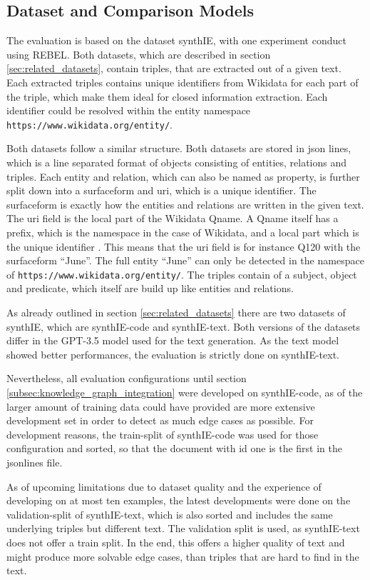 \documentclass[a4paper,oneside,bibliography=totoc]{scrbook}
\begin{document}
\subsection{Dataset and Comparison Models}
\label{sec:dataset}

The evaluation is based on the dataset synthIE, with one experiment conduct using REBEL. Both datasets, which are described in section \ref{sec:related_datasets}, contain triples, that are extracted out of a given text. Each extracted triples contains unique identifiers from Wikidata for each part of the triple, which make them ideal for closed information extraction. Each identifier could be resolved within the entity namespace \texttt{https://www.wikidata.org/entity/}.

Both datasets follow a similar structure. Both datasets are stored in json lines, which is a line separated format of objects consisting of entities, relations and triples. Each entity and relation, which can also be named as property, is further split down into a surfaceform and uri, which is a unique identifier. The surfaceform is exactly how the entities and relations are written in the given text. The uri field is the local part of the Wikidata Qname. A Qname itself has a prefix, which is the namespace in the case of Wikidata, and a local part which is the unique identifier \cite{ASF2010}. This means that the uri field is for instance Q120 with the surfaceform \enquote{June}. The full entity \enquote{June} can only be detected in the namespace of \texttt{https://www.wikidata.org/entity/}. The triples contain of a subject, object and predicate, which itself are build up like entities and relations.

As already outlined in section \ref{sec:related_datasets} there are two datasets of synthIE, which are synthIE-code and synthIE-text. Both versions of the datasets differ in the GPT-3.5 model used for the text generation. As the text model showed better performances, the evaluation is strictly done on synthIE-text.

Nevertheless, all evaluation configurations until section \ref{subsec:knowledge_graph_integration} were developed on synthIE-code, as of the larger amount of training data could have provided are more extensive development set in order to detect as much edge cases as possible. For development reasons, the train-split of synthIE-code was used for those configuration and sorted, so that the document with id one is the first in the jsonlines file.

As of upcoming limitations due to dataset quality and the experience of developing on at most ten examples, the latest developments were done on the validation-split of synthIE-text, which is also sorted and includes the same underlying triples but different text. The validation split is used, as synthIE-text does not offer a train split. In the end, this offers a higher quality of text and might produce more solvable edge cases, than triples that are hard to find in the text.
\end{document}
